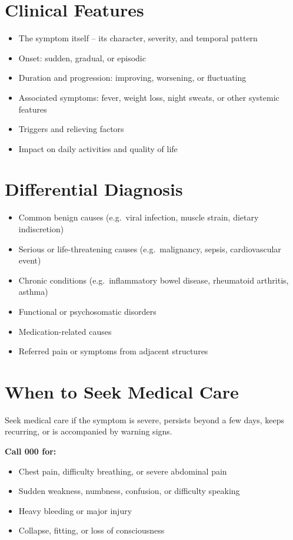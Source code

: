 \section*{Clinical Features}
\begin{itemize}
    \item The symptom itself -- its character, severity, and temporal pattern
    \item Onset: sudden, gradual, or episodic
    \item Duration and progression: improving, worsening, or fluctuating
    \item Associated symptoms: fever, weight loss, night sweats, or other systemic features
    \item Triggers and relieving factors
    \item Impact on daily activities and quality of life
\end{itemize}

\section*{Differential Diagnosis}
\begin{itemize}
    \item Common benign causes (e.g.\ viral infection, muscle strain, dietary indiscretion)
    \item Serious or life-threatening causes (e.g.\ malignancy, sepsis, cardiovascular event)
    \item Chronic conditions (e.g.\ inflammatory bowel disease, rheumatoid arthritis, asthma)
    \item Functional or psychosomatic disorders
    \item Medication-related causes
    \item Referred pain or symptoms from adjacent structures
\end{itemize}

\section*{When to Seek Medical Care}
Seek medical care if the symptom is severe, persists beyond a few days, keeps recurring, or is accompanied by warning signs.

\textbf{Call 000 for:}
\begin{itemize}
    \item Chest pain, difficulty breathing, or severe abdominal pain
    \item Sudden weakness, numbness, confusion, or difficulty speaking
    \item Heavy bleeding or major injury
    \item Collapse, fitting, or loss of consciousness
\end{itemize}

